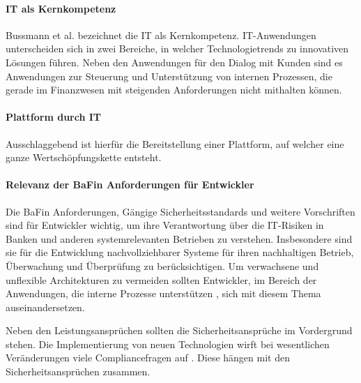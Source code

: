 \paragraph{IT als Kernkompetenz} Bussmann et al. bezeichnet die IT als Kernkompetenz. IT-Anwendungen unterscheiden sich in zwei Bereiche, in welcher Technologietrends zu innovativen Lösungen führen. Neben den Anwendungen für den Dialog mit Kunden sind es Anwendungen zur Steuerung und Unterstützung von internen Prozessen, die gerade im Finanzwesen mit steigenden Anforderungen nicht mithalten können. \cite{Bussmann2006}
\medskip
\\



\paragraph{Plattform durch IT}
Ausschlaggebend ist hierfür die Bereitstellung einer Plattform, auf welcher eine ganze Wertschöpfungskette entsteht.

\paragraph{Relevanz der BaFin Anforderungen für Entwickler}
Die BaFin Anforderungen, Gängige Sicherheitsstandards und weitere Vorschriften sind für Entwickler wichtig, um ihre Verantwortung über die IT-Risiken in Banken und anderen systemrelevanten Betrieben zu verstehen. Insbesondere sind sie für die Entwicklung nachvollziehbarer Systeme für ihren nachhaltigen Betrieb, Überwachung und Überprüfung zu berücksichtigen. Um verwachsene und unflexible Architekturen zu vermeiden sollten Entwickler, im Bereich der Anwendungen, die interne Prozesse unterstützen \cite{Bussmann2006}, sich mit diesem Thema auseinandersetzen.

Neben den Leistungsansprüchen sollten die Sicherheitsansprüche im Vordergrund stehen. Die Implementierung von neuen Technologien wirft bei wesentlichen Veränderungen viele Compliancefragen auf \cite{MaRisk:2017}. Diese hängen mit den Sicherheitsansprüchen zusammen. 

